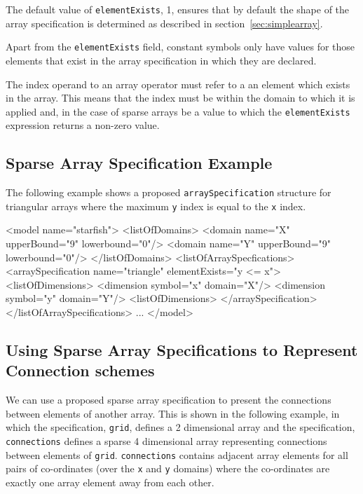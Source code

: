 \documentclass{cekarticle}
\begin{document}
The default value of \texttt{elementExists}, 1, ensures that
by default the shape of the array specification is determined
as described in section~\ref{sec:simplearray}.

Apart from the \texttt{elementExists} field, constant
symbols only have values for those elements that exist in the
array specification in which they are declared.

The index operand to an array operator must refer to a an element
which exists in the array.  This means that the index must be
within the domain to which it is applied and, in the case of
sparse arrays be a value to which the \texttt{elementExists}
expression returns a non-zero value.

\subsection{Sparse Array Specification Example}
\label{sec:sparseeg}

The following example shows a proposed
\texttt{arraySpecification} structure for triangular arrays where
the maximum \texttt{y} index is equal to the \texttt{x} index.

\begin{example}
<model name="starfish">
    <listOfDomains>
        <domain name="X" upperBound="9" lowerbound="0"/>
        <domain name="Y" upperBound="9" lowerbound="0"/>
    </listOfDomains>
    <listOfArraySpecfications>
        <arraySpecification name="triangle" elementExists="y <= x">
            <listOfDimensions>
                <dimension symbol="x" domain="X"/>
                <dimension symbol="y" domain="Y"/>
            <listOfDimensions>
        </arraySpecification>
    </listOfArraySpecifications>
    ...
</model>
\end{example}

\subsection{Using Sparse Array Specifications to Represent Connection schemes}
\label{sec:connections}

We can use a proposed sparse array specification to present the
connections between elements of another array.  This is shown in
the following example, in which the specification, \texttt{grid},
defines a 2 dimensional array and the specification,
\texttt{connections} defines a sparse 4 dimensional array
representing connections between elements of \texttt{grid}.
\texttt{connections} contains adjacent array elements for all pairs of
co-ordinates (over the \texttt{x} and \texttt{y} domains) where
the co-ordinates are exactly one array element away from each other.
\end{document}
